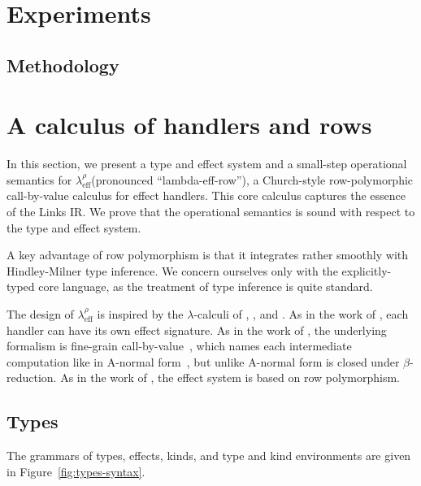 \documentclass[mscres,cdtppar,twoside,openright,logo,rightchapter,normalheadings]{infthesis}
\theoremstyle{definition}
\newcommand{\Calc}{\ensuremath{\lambda_{\text{eff}}^\rho}\xspace}
\begin{document}
\chapter{Experiments}
\label{ch:experiments}

\section{Methodology}
\label{sec:methodology}

\chapter{A calculus of handlers and rows}
\label{sec:lambe-eff-row}

In this section, we present a type and effect system and a small-step
operational semantics for \Calc (pronounced ``lambda-eff-row''), a
Church-style row-polymorphic call-by-value calculus for effect
handlers.
%
This core calculus captures the essence of the Links IR.
%
We prove that the operational semantics is sound with respect to the
type and effect system.

A key advantage of row polymorphism is that it integrates rather
smoothly with Hindley-Milner type inference. We concern ourselves only
with the explicitly-typed core language, as the treatment of type
inference is quite standard.

The design of \Calc is inspired by the $\lambda$-calculi of
\citet{Kammar2013}, \citet{Pretnar2015}, and \citet{Lindley2012}.
%
As in the work of \citet{Kammar2013}, each handler can have its own
effect signature. As in the work of \citet{Pretnar2015}, the
underlying formalism is fine-grain call-by-value~\cite{LevyPT03},
which names each intermediate computation like in A-normal
form~\cite{Flanagan1993}, but unlike A-normal form is closed under
$\beta$-reduction. As in the work of \citet{Lindley2012}, the effect
system is based on row polymorphism.

\section{Types}
The grammars of types, effects, kinds, and type and kind environments
are given in Figure~\ref{fig:types-syntax}.
\end{document}
